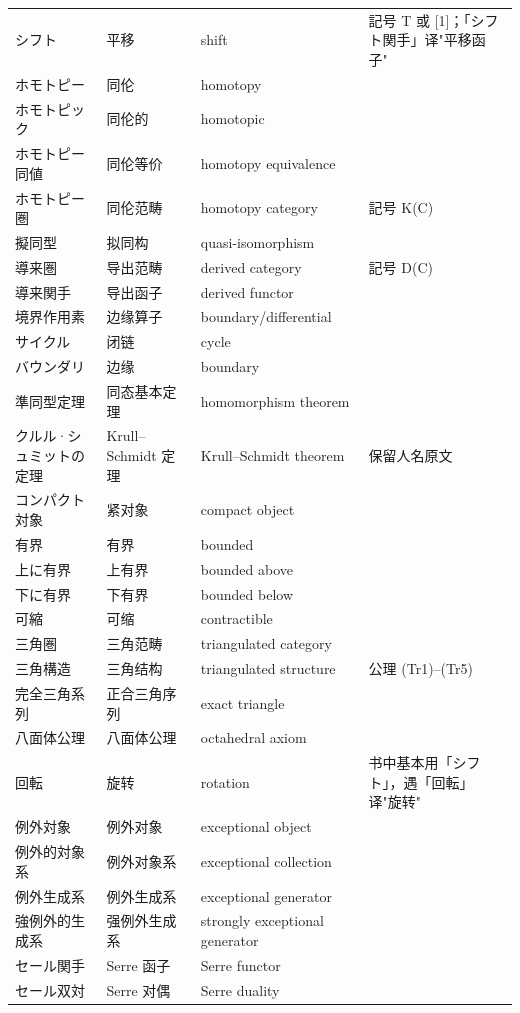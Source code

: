 \begin{longtable}{p{}p{}p{}p{}}
シフト & 平移 & shift & 記号 T 或 [1]；「シフト関手」译"平移函子" \\
ホモトピー & 同伦 & homotopy &  \\
ホモトピック & 同伦的 & homotopic &  \\
ホモトピー同値 & 同伦等价 & homotopy equivalence &  \\
ホモトピー圏 & 同伦范畴 & homotopy category & 記号 K(C) \\
擬同型 & 拟同构 & quasi-isomorphism &  \\
導来圏 & 导出范畴 & derived category & 記号 D(C) \\
導来関手 & 导出函子 & derived functor &  \\
境界作用素 & 边缘算子 & boundary/differential &  \\
サイクル & 闭链 & cycle &  \\
バウンダリ & 边缘 & boundary &  \\
準同型定理 & 同态基本定理 & homomorphism theorem &  \\
クルル·シュミットの定理 & Krull–Schmidt 定理 & Krull–Schmidt theorem & 保留人名原文 \\
コンパクト対象 & 紧对象 & compact object &  \\
有界 & 有界 & bounded &  \\
上に有界 & 上有界 & bounded above &  \\
下に有界 & 下有界 & bounded below &  \\
可縮 & 可缩 & contractible &  \\
三角圏 & 三角范畴 & triangulated category &  \\
三角構造 & 三角结构 & triangulated structure & 公理 (Tr1)–(Tr5) \\
完全三角系列 & 正合三角序列 & exact triangle &  \\
八面体公理 & 八面体公理 & octahedral axiom &  \\
回転 & 旋转 & rotation & 书中基本用「シフト」，遇「回転」译"旋转" \\
例外対象 & 例外对象 & exceptional object &  \\
例外的対象系 & 例外对象系 & exceptional collection &  \\
例外生成系 & 例外生成系 & exceptional generator &  \\
強例外的生成系 & 强例外生成系 & strongly exceptional generator &  \\
セール関手 & Serre 函子 & Serre functor &  \\
セール双対 & Serre 对偶 & Serre duality &  \\

\end{longtable}
